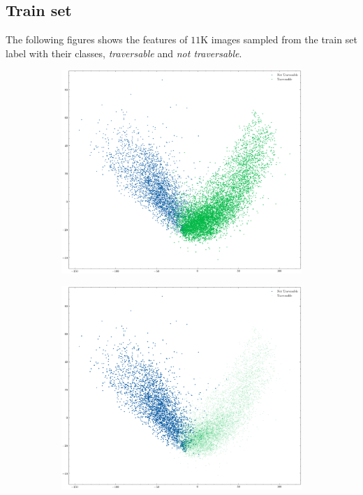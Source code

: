 \documentclass[../document.tex]{subfiles}
\begin{document}
\subsection{Train set}
The following figures shows the features of $11$K images sampled from the train set label with their classes, \emph{traversable} and \emph{not traversable}.
\begin{figure}[H]
    \centering
    \begin{subfigure}[b]{1\textwidth}
        \includegraphics[width=\linewidth]{../img/5/pca/pca.png}
    \end{subfigure}
    \begin{subfigure}[b]{0.48\textwidth}
        \includegraphics[width=\linewidth]{../img/5/pca/pca-0.png}

\end{subfigure}
\end{figure}
\end{document}
